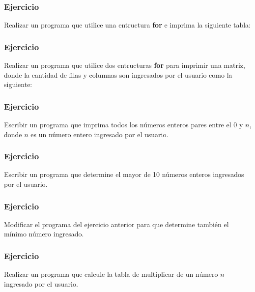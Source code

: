 \subsubsection{Ejercicio}
Realizar un programa que utilice una entructura \textbf{for} e imprima la siguiente tabla:
{\small
  \lstset{inputencoding=utf8/latin1}
  
}

\subsubsection{Ejercicio}
Realizar un programa que utilice dos entructuras \textbf{for} para imprimir una matriz, donde la cantidad de filas y columnas son ingresados por el usuario como la siguiente:
{\small
  \lstset{inputencoding=utf8/latin1}
  
}

\subsubsection{Ejercicio}
Escribir un programa que imprima todos los números enteros pares entre el 0 y $n$, donde $n$ es un número entero ingresado por el usuario.
{\small
  \lstset{inputencoding=utf8/latin1}
  
}

\subsubsection{Ejercicio}
Escribir un programa que determine el mayor de 10 números enteros ingresados por el usuario.
{\small
  \lstset{inputencoding=utf8/latin1}
  
}

\subsubsection{Ejercicio}
Modificar el programa del ejercicio anterior para que determine también el mínimo número ingresado.
{\small
  \lstset{inputencoding=utf8/latin1}
  
}

\subsubsection{Ejercicio}
Realizar un programa que calcule la tabla de multiplicar de un número $n$ ingresado por el usuario.
{\small
  \lstset{inputencoding=utf8/latin1}
  
}

